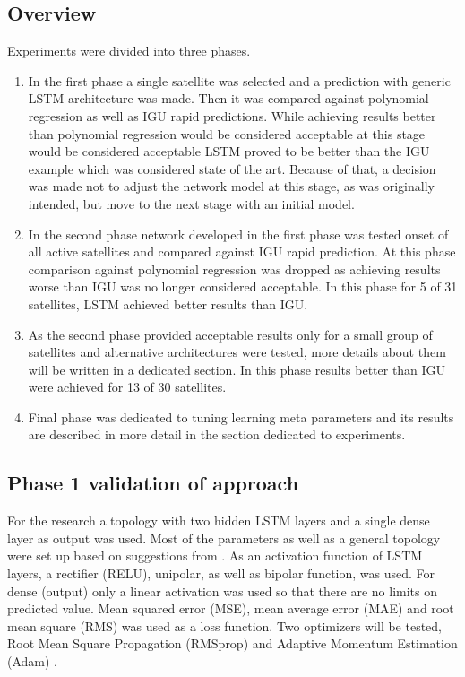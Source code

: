 \documentclass{article}
\begin{document}
\subsection{Overview}
Experiments were divided into three phases.
\begin{enumerate}
\item In the first phase a single satellite was selected and a prediction with generic LSTM architecture was made. Then it was compared against polynomial regression as well as IGU rapid predictions.
	While achieving results better than polynomial regression would be considered acceptable at this stage would be considered acceptable LSTM proved to be better than the IGU example which was considered state of the art. Because of that, a decision was made not to adjust the network
	model at this stage, as was originally intended, but move to the next stage with an initial model.

\item In the second phase network developed in the first phase was tested onset of all active satellites and compared against IGU rapid prediction. At this phase comparison against polynomial regression was dropped as achieving results worse than IGU was no longer considered acceptable. In this phase for 5 of 31 satellites, LSTM achieved better 
	results than IGU.

\item As the second phase provided acceptable results only for a small group of satellites and alternative architectures were tested, more details about them will be written in a dedicated section. In this phase results better than IGU were achieved for 13 of 30 satellites.
\item Final phase was dedicated to tuning learning meta parameters and its results are described in more detail in the section dedicated to experiments.

\end{enumerate}

\subsection{Phase 1 validation of approach}
For the research a topology with two hidden LSTM layers and a single dense layer as output was 
used. 
Most of the parameters as well as a general topology were set up based on suggestions from 
\cite{Chollet2018}. As an activation function of LSTM layers, a rectifier (RELU),
unipolar, as well as bipolar function, was used.
For dense (output) only a linear activation was used so that there are no limits on predicted 
value.
Mean squared error (MSE), mean average error (MAE) and root mean square (RMS)
was used as a loss function.
Two optimizers will be tested, Root Mean Square Propagation (RMSprop)\cite{Hinton2012} and 
Adaptive Momentum Estimation (Adam) \cite{Kingma2015}.
\end{document}
